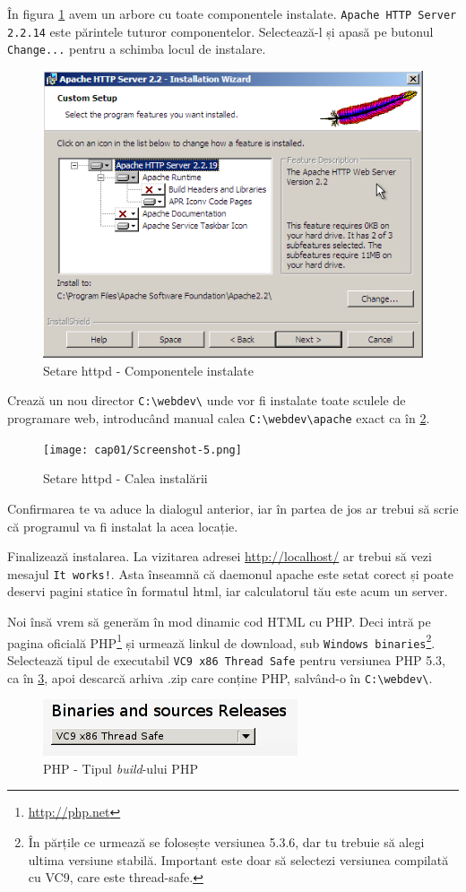 În figura \ref{fig:httpd components tree} avem un arbore cu toate componentele instalate. \texttt{Apache HTTP Server 2.2.14}
este părintele tuturor componentelor. Selectează-l și apasă pe butonul
\texttt{Change...} pentru a schimba locul de instalare.

\begin{figure}[ht!]
 \centering
   \includegraphics[width=248bp]{cap01/Screenshot-4.png}
 \caption{Setare httpd - Componentele instalate}
 \label{fig:httpd components tree}
\end{figure}

Crează un nou director \texttt{C:{\textbackslash}webdev\textbackslash}
unde vor fi instalate toate sculele
de programare web, introducând manual calea \texttt{C:{\textbackslash}webdev{\textbackslash}apache}
exact ca în \ref{fig:httpd custom path}.

\begin{figure}[ht!]
 \centering
   \texttt{[image: cap01/Screenshot-5.png]}
 \caption{Setare httpd - Calea instalării}
 \label{fig:httpd custom path}
\end{figure}

Confirmarea te va aduce la dialogul anterior, iar în partea de jos ar trebui să scrie
că programul va fi instalat la acea locație.

Finalizează instalarea. La vizitarea adresei \url{http://localhost/} ar trebui să
vezi mesajul \texttt{It works!}. Asta înseamnă că daemonul apache este setat corect și poate deservi
pagini statice în formatul html, iar calculatorul tău este acum un server.

Noi însă vrem să generăm în mod dinamic cod HTML cu PHP. Deci intră pe pagina oficială
PHP\footnote{\url{http://php.net}} și urmează linkul de download,
sub \texttt{Windows binaries}\footnote{În părțile ce urmează se folosește
versiunea 5.3.6, dar tu trebuie să alegi ultima versiune stabilă. Important este 
doar să selectezi versiunea compilată cu VC9, care este thread-safe.}.
Selectează tipul de executabil \texttt{VC9 x86 Thread Safe} pentru
versiunea PHP 5.3, ca în \ref{fig:php build type}, apoi
descarcă arhiva .zip care conține PHP, salvând-o în \texttt{C:{\textbackslash}webdev\textbackslash}.
\begin{figure}[ht!]
 \centering
   \includegraphics[width=150bp]{cap01/Screenshot-7.png}
 \caption{PHP - Tipul \textsl{build}-ului PHP}
 \label{fig:php build type}
\end{figure}


